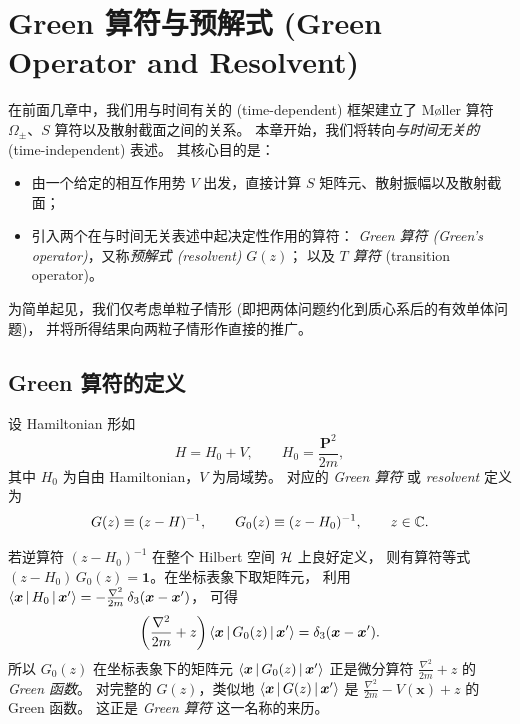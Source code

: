 \chapter{Green 算符与预解式 (Green Operator and Resolvent)}\label{ch:green}

在前面几章中，我们用与时间有关的 (time-dependent) 框架建立了
M\o ller 算符 $\Omega_\pm$、$S$ 算符以及散射截面之间的关系。
本章开始，我们将转向\emph{与时间无关的} (time-independent) 表述。
其核心目的是：
\begin{itemize}
  \item 由一个给定的相互作用势 $V$ 出发，直接计算 $S$ 矩阵元、散射振幅以及散射截面；
  \item 引入两个在与时间无关表述中起决定性作用的算符：
        \emph{Green 算符 (Green's operator)}，又称\emph{预解式 (resolvent)} $G(z)$；
        以及 \emph{$T$ 算符} (transition operator)。
\end{itemize}
为简单起见，我们仅考虑单粒子情形 (即把两体问题约化到质心系后的有效单体问题)，
并将所得结果向两粒子情形作直接的推广。

\section{Green 算符的定义}

设 Hamiltonian 形如
\begin{equation}
  H = H_0 + V,\qquad H_0 = \frac{\bm{P}^2}{2m},
\end{equation}
其中 $H_0$ 为自由 Hamiltonian，$V$ 为局域势。
对应的 \emph{Green 算符} 或 \emph{resolvent} 定义为
\begin{equation}\label{eq:green-def}
  G(z) \equiv (z - H)^{-1},\qquad
  G_0(z) \equiv (z - H_0)^{-1},\qquad z\in\mathbb{C}.
\end{equation}

\begin{remark}[算符层面的意义]
若逆算符 $(z-H_0)^{-1}$ 在整个 Hilbert 空间 $\mathcal{H}$ 上良好定义，
则有算符等式 $(z-H_0)\,G_0(z)=\mathbf{1}$。在坐标表象下取矩阵元，
利用 $\left\langle \bm x \,\middle|\, H_0 \,\middle|\, \bm x' \right\rangle = -\frac{\nabla^2}{2m}\,\delta_3(\bm x-\bm x')$，
可得
\begin{equation}\label{eq:G0-coordinate-greens-fn}
  \left(\frac{\nabla^2}{2m} + z\right)\left\langle \bm x \,\middle|\, G_0(z) \,\middle|\, \bm x' \right\rangle
  = \delta_3(\bm x - \bm x').
\end{equation}
所以 $G_0(z)$ 在坐标表象下的矩阵元
$\left\langle \bm x \,\middle|\, G_0(z) \,\middle|\, \bm x' \right\rangle$
正是微分算符 $\frac{\nabla^2}{2m}+z$ 的 \emph{Green 函数}。
对完整的 $G(z)$，类似地 $\left\langle \bm x \,\middle|\, G(z) \,\middle|\, \bm x' \right\rangle$
是 $\frac{\nabla^2}{2m}-V(\bm x)+z$ 的 Green 函数。
这正是 \emph{Green 算符} 这一名称的来历。
\end{remark}

